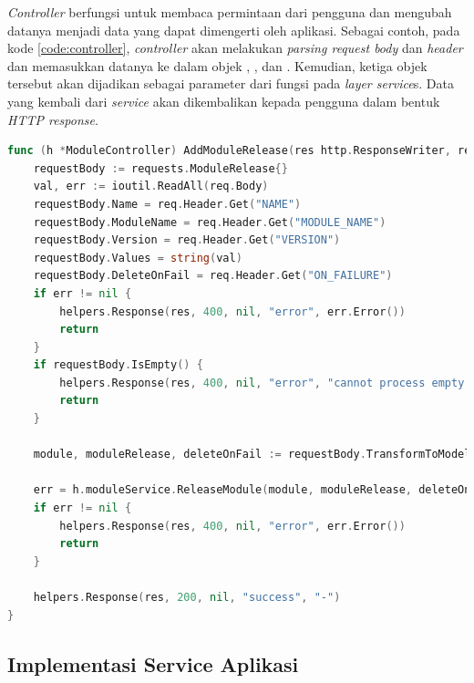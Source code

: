 \textit{Controller} berfungsi untuk membaca permintaan dari pengguna dan mengubah datanya menjadi data yang dapat dimengerti oleh aplikasi. Sebagai contoh, pada kode \ref{code:controller}, \textit{controller} akan melakukan \textit{parsing request body} dan \textit{header} dan memasukkan datanya ke dalam objek , , dan . Kemudian, ketiga objek tersebut akan dijadikan sebagai parameter dari fungsi pada \textit{layer service}s. Data yang kembali dari \textit{service} akan dikembalikan kepada pengguna dalam bentuk \textit{HTTP response}.

\begin{lstlisting}[frame=single,language=Go,caption={Contoh Fungsi \textit{Controller}},label={code:controller}]
func (h *ModuleController) AddModuleRelease(res http.ResponseWriter, req *http.Request) {
	requestBody := requests.ModuleRelease{}
	val, err := ioutil.ReadAll(req.Body)
	requestBody.Name = req.Header.Get("NAME")
	requestBody.ModuleName = req.Header.Get("MODULE_NAME")
	requestBody.Version = req.Header.Get("VERSION")
	requestBody.Values = string(val)
	requestBody.DeleteOnFail = req.Header.Get("ON_FAILURE")
	if err != nil {
		helpers.Response(res, 400, nil, "error", err.Error())
		return
	}
	if requestBody.IsEmpty() {
		helpers.Response(res, 400, nil, "error", "cannot process empty request")
		return
	}

	module, moduleRelease, deleteOnFail := requestBody.TransformToModels(true)

	err = h.moduleService.ReleaseModule(module, moduleRelease, deleteOnFail)
	if err != nil {
		helpers.Response(res, 400, nil, "error", err.Error())
		return
	}

	helpers.Response(res, 200, nil, "success", "-")
}
\end{lstlisting}

\subsection{Implementasi Service Aplikasi}
\label{sec:serviceImpl}

